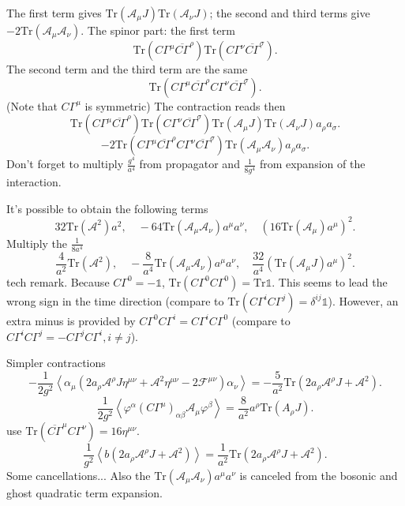 The first term gives $\mathrm{Tr}(\mathcal{A}_\mu J)
\mathrm{Tr}(\mathcal{A}_\nu J)$;
the second and third terms give $- 2\mathrm{Tr}(\mathcal{A}_\mu \mathcal{A}_\nu)$.
The spinor part: the first term
\[
	\mathrm{Tr} (C\Gamma^\mu \overline{C\Gamma}^\rho)
	\mathrm{Tr} (C\Gamma^\nu \overline{C\Gamma}^\sigma)
.\] 
The second term and the third term are the same
\[
\mathrm{Tr}( C\Gamma^\mu \overline{C\Gamma}^\rho C\Gamma^\nu
\overline{C\Gamma}^\sigma)
.\] 
(Note that $C\Gamma^\mu$ is symmetric)
The contraction reads then
\[
	\mathrm{Tr} (C\Gamma^\mu \overline{C\Gamma}^\rho)
	\mathrm{Tr} (C\Gamma^\nu \overline{C\Gamma}^\sigma)
	\mathrm{Tr}(\mathcal{A}_\mu J)
	\mathrm{Tr}(\mathcal{A}_\nu J)
	a_\rho a_\sigma
.\] 
\[
	- 2
\mathrm{Tr}( C\Gamma^\mu \overline{C\Gamma}^\rho C\Gamma^\nu
\overline{C\Gamma}^\sigma)
\mathrm{Tr}(\mathcal{A}_\mu \mathcal{A}_\nu) a_\rho a_\sigma
.\] 
Don't forget to multiply $\frac{g^4}{a^4}$ from propagator
and $\frac{1}{8g^4}$ from expansion of the interaction.

It's possible to obtain the following terms
\[
32 \mathrm{Tr}(\mathcal{A}^2) a^2,\quad
-64\mathrm{Tr}(\mathcal{A}_\mu \mathcal{A}_\nu) a^\mu a^\nu,\quad
	(16 \mathrm{Tr}(\mathcal{A}_\mu) a^\mu)^2
.\] 
Multiply the $\frac{1}{8a^4}$
\[
\frac{4}{a^2} \mathrm{Tr}(\mathcal{A}^2) ,\quad
-\frac{8}{a^4} \mathrm{Tr}(\mathcal{A}_\mu \mathcal{A}_\nu) a^\mu a^\nu,\quad
	\frac{32}{a^4}( \mathrm{Tr}(\mathcal{A}_\mu J) a^\mu)^2
.\] 
tech remark. Because $C\Gamma^0 = - \mathds{1}$, $\mathrm{Tr}(C\Gamma^0 C\Gamma^0) = \mathrm{Tr}\mathds{1}$.
This seems to lead the wrong sign in the time direction
(compare to $\mathrm{Tr}(C\Gamma^i C\Gamma^j) = \delta^{ij}\mathds{1}$).
However, an extra minus is provided by $C\Gamma^0 C\Gamma^i = C\Gamma^i C\Gamma^0$ (compare to $C\Gamma^i C\Gamma^j = - C\Gamma^j C \Gamma^i,i\neq j$).

Simpler contractions
\[
- \frac{1}{2g^2}
\left<\alpha_\mu( 2 a_\rho \mathcal{A}^\rho J \eta^{\mu\nu}
+ \mathcal{A}^2 \eta^{\mu\nu}
- 2 \mathcal{F}^{\mu\nu})\alpha_\nu\right>
= - \frac{5}{a^2} \mathrm{Tr}( 2 a_\rho \mathcal{A}^\rho J
+ \mathcal{A}^2)
.\] 
\[
\frac{1}{2g^2} \left<\varphi^\alpha
(C\Gamma^\mu)_{\alpha\beta} \mathcal{A}_\mu \varphi^\beta\right>
= \frac{8}{a^2} a^\rho \mathrm{Tr}(A_\rho J)
.\] 
use $\mathrm{Tr}(\overline{C\Gamma}^\mu C\Gamma^\nu) = 16 \eta^{\mu\nu}$.
\[
	\frac{1}{g^2} \left<b ( 2a_\rho \mathcal{A}^\rho J
	+ \mathcal{A}^2)\right>
 = \frac{1}{a^2} \mathrm{Tr}(2a_\rho \mathcal{A}^\rho J + \mathcal{A}^2)
.\] 
Some cancellations...
Also the $\mathrm{Tr}(\mathcal{A}_\mu \mathcal{A}_\nu) a^\mu a^\nu$
is canceled from the bosonic and ghost quadratic term expansion.
